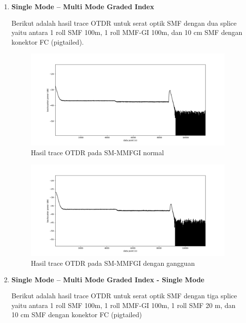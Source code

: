 \documentclass[12pt]{article}
\begin{document}
\begin{enumerate}
		\item \textbf{Single Mode – Multi Mode Graded Index}
		
		Berikut adalah hasil trace OTDR untuk serat optik SMF dengan dua splice yaitu antara 1 roll SMF 100m, 1 roll MMF-GI 100m, dan 10 cm SMF dengan konektor FC (pigtailed).
		
		\begin{figure}[!h]
			\centering
			\captionsetup{justification=centering}
			\includegraphics[width=\linewidth]{images/Bab_4/Bab_4_3c1}
			\caption[Trace SM-MMFGI ]{\small{Hasil trace OTDR pada SM-MMFGI normal}}
		\end{figure}
		
		\begin{figure}[!h]
			\centering
			\captionsetup{justification=centering}
			\includegraphics[width=\linewidth]{images/Bab_4/Bab_4_3c2}
			\caption[Trace SM-MMFGI ]{\small{Hasil trace OTDR pada SM-MMFGI dengan gangguan}}
		\end{figure}
		
		\item \textbf{Single Mode – Multi Mode Graded Index - Single Mode }
		
		Berikut adalah hasil trace OTDR untuk serat optik SMF dengan tiga splice yaitu antara 1 roll SMF 100m, 1 roll MMF-GI 100m, 1 roll SMF 20 m, dan 10 cm SMF dengan konektor FC (pigtailed)
		

\end{enumerate}
\end{document}
